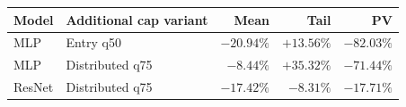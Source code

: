\begin{tabular}{@{}llrrr@{}}
\toprule
Model & Additional cap variant & Mean & Tail & PV \\
\midrule
MLP & Entry q50 & $-20.94\%$ & $+13.56\%$ & $-82.03\%$ \\
MLP & Distributed q75 & $-8.44\%$ & $+35.32\%$ & $-71.44\%$ \\
ResNet & Distributed q75 & $-17.42\%$ & $-8.31\%$ & $-17.71\%$ \\
\bottomrule
\end{tabular}
